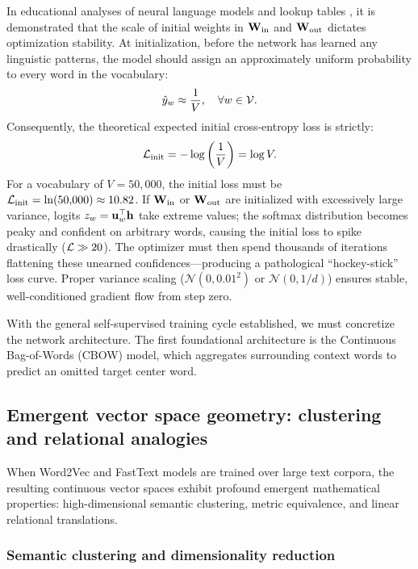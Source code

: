 \documentclass[../../main.tex]{subfiles}
\begin{document}
In educational analyses of neural language models and lookup tables \cite{karpathy2022makemore}, it is demonstrated that the scale of initial weights in $\mathbf{W}_{\text{in}}$ and $\mathbf{W}_{\text{out}}$ dictates optimization stability. At initialization, before the network has learned any linguistic patterns, the model should assign an approximately uniform probability to every word in the vocabulary:
\begin{equation}
\label{eq:uniform_prior}
\hat{y}_w \approx \frac{1}{V}, \quad \forall w \in \mathcal{V}.
\end{equation}
Consequently, the theoretical expected initial cross-entropy loss is strictly:
\begin{equation}
\label{eq:expected_initial_loss}
\mathcal{L}_{\text{init}} = -\log \left( \frac{1}{V} \right) = \log V.
\end{equation}
For a vocabulary of $V = 50{,}000$, the initial loss must be $\mathcal{L}_{\text{init}} = \ln(50{,}000) \approx 10.82$. If $\mathbf{W}_{\text{in}}$ or $\mathbf{W}_{\text{out}}$ are initialized with excessively large variance, logits $z_w = \mathbf{u}_w^\top \mathbf{h}$ take extreme values; the softmax distribution becomes peaky and confident on arbitrary words, causing the initial loss to spike drastically ($\mathcal{L} \gg 20$). The optimizer must then spend thousands of iterations flattening these unearned confidences---producing a pathological ``hockey-stick'' loss curve. Proper variance scaling ($\mathcal{N}(0, 0.01^2)$ or $\mathcal{N}(0, 1/d)$) ensures stable, well-conditioned gradient flow from step zero.

With the general self-supervised training cycle established, we must concretize the network architecture. The first foundational architecture is the Continuous Bag-of-Words (CBOW) model, which aggregates surrounding context words to predict an omitted target center word.

\clearpage


\subsection{Emergent vector space geometry: clustering and relational analogies}
\label{sec:vector_geometry_metrics}

When Word2Vec and FastText models are trained over large text corpora, the resulting continuous vector spaces exhibit profound emergent mathematical properties: high-dimensional semantic clustering, metric equivalence, and linear relational translations.

\subsubsection{Semantic clustering and dimensionality reduction}
\label{subsec:semantic_clustering_pca}
\end{document}
